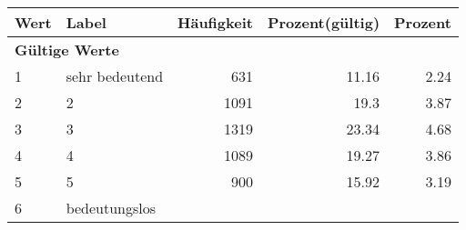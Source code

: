      \begin{longtable}{lXrrr}
     \toprule
     \textbf{Wert} & \textbf{Label} & \textbf{Häufigkeit} & \textbf{Prozent(gültig)} & \textbf{Prozent} \\
     \endhead
     \midrule
     \multicolumn{5}{l}{\textbf{Gültige Werte}}\\

     1 &
     \multicolumn{1}{X}{ sehr bedeutend   } &


       \num{631} &
       \num[round-mode=places,round-precision=2]{11.16} &
         \num[round-mode=places,round-precision=2]{2.24} \\

     2 &
     \multicolumn{1}{X}{ 2   } &


       \num{1091} &
       \num[round-mode=places,round-precision=2]{19.3} &
         \num[round-mode=places,round-precision=2]{3.87} \\

     3 &
     \multicolumn{1}{X}{ 3   } &


       \num{1319} &
       \num[round-mode=places,round-precision=2]{23.34} &
         \num[round-mode=places,round-precision=2]{4.68} \\

     4 &
     \multicolumn{1}{X}{ 4   } &


       \num{1089} &
       \num[round-mode=places,round-precision=2]{19.27} &
         \num[round-mode=places,round-precision=2]{3.86} \\

     5 &
     \multicolumn{1}{X}{ 5   } &


       \num{900} &
       \num[round-mode=places,round-precision=2]{15.92} &
         \num[round-mode=places,round-precision=2]{3.19} \\

     6 &
     \multicolumn{1}{X}{ bedeutungslos   } &



\end{longtable}
